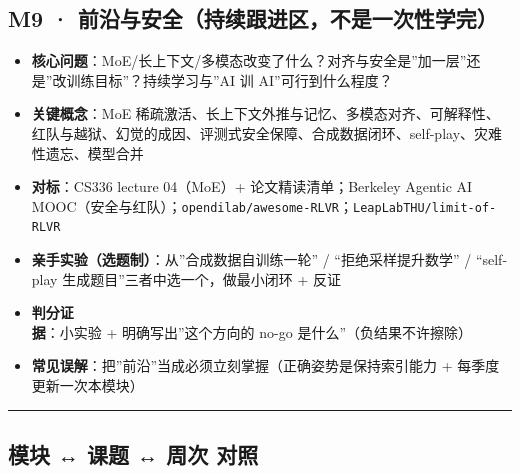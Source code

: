 \documentclass[
  chinese,
  11pt,
]{ctexart}
\providecommand{\tightlist}{%
  \setlength{\itemsep}{0pt}\setlength{\parskip}{0pt}}
\begin{document}
\subsection{M9 · 前沿与安全（持续跟进区，不是一次性学完）}\label{m9-ux524dux6cbfux4e0eux5b89ux5168ux6301ux7eedux8ddfux8fdbux533aux4e0dux662fux4e00ux6b21ux6027ux5b66ux5b8c}

\begin{itemize}
\tightlist
\item
  \textbf{核心问题}：MoE/长上下文/多模态改变了什么？对齐与安全是''加一层''还是''改训练目标''？持续学习与''AI 训 AI''可行到什么程度？
\item
  \textbf{关键概念}：MoE 稀疏激活、长上下文外推与记忆、多模态对齐、可解释性、红队与越狱、幻觉的成因、评测式安全保障、合成数据闭环、self-play、灾难性遗忘、模型合并
\item
  \textbf{对标}：CS336 lecture 04（MoE）+ 论文精读清单；Berkeley Agentic AI MOOC（安全与红队）；\texttt{opendilab/awesome-RLVR}；\texttt{LeapLabTHU/limit-of-RLVR}
\item
  \textbf{亲手实验（选题制）}：从''合成数据自训练一轮'' / ``拒绝采样提升数学'' / ``self-play 生成题目''三者中选一个，做最小闭环 + 反证
\item
  \textbf{判分证据}：小实验 + 明确写出''这个方向的 no-go 是什么''（负结果不许擦除）
\item
  \textbf{常见误解}：把''前沿''当成必须立刻掌握（正确姿势是保持索引能力 + 每季度更新一次本模块）
\end{itemize}

\begin{center}\rule{0.5\linewidth}{0.5pt}\end{center}

\subsection{模块 ↔ 课题 ↔ 周次 对照}\label{ux6a21ux5757-ux8bfeux9898-ux5468ux6b21-ux5bf9ux7167}
\end{document}
